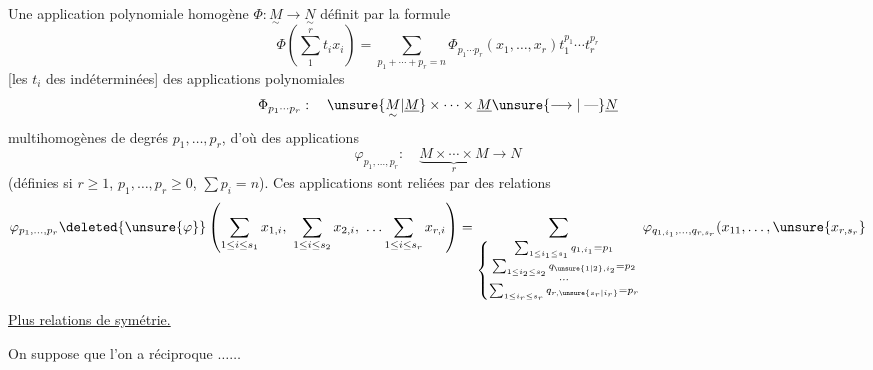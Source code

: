 Une application polynomiale homogène  $\Phi:\underset{\sim}{M}\longrightarrow\underset{\sim}{N}$ définit par la formule
\[
\Phi\left(\sum_1^r t_ix_i\right)=\sum_{p_1+\cdots+p_r=n}\Phi_{p_1\cdots p_r}(x_1,\ldots,x_r)t_1^{p_1}\cdots t_r^{p_r}
\]
[les $t_i$ des indéterminées] des applications polynomiales
\[
\Phi_{p_1\cdots p_r}:\quad\unsure{\underset{\sim}{M}|\underline M}\times\cdots\times\underline M\unsure{\longrightarrow|\mathrel{\text{---}}}\underline N
\]
multihomogènes de degrés $p_1,\ldots,p_r$, d'où des applications
\[
\varphi_{p_1,\ldots,p_r}:\quad\underbrace{M\times\cdots\times M}_{r}\longrightarrow N
\]
(définies si $r\geq1$, $p_1,\ldots,p_r\geq0$, $\sum p_i=n$). Ces applications sont reliées par des relations
\[
\varphi_{p_1,\ldots,p_r}\deleted{\unsure{\varphi}}\left(\sum_{1\leq i\leq s_1}x_{1,i},\ \sum_{1\leq i\leq s_2}x_{2,i},\ \ldots\sum_{1\leq i\leq s_r}x_{r,i}\right)
=\sum_{\left\{\substack{\sum_{1\leq i_1\leq s_1}q_{1,i_1}=p_1\\\sum_{1\leq i_2\leq s_2}q_{\unsure{1|2},i_2}=p_2\\\cdots\\\sum_{1\leq i_r\leq s_r}q_{r,\unsure{s_r|i_r}}=p_r}\right.}
\varphi_{q_{1,i_1},\ldots,q_{r,s_r}}(x_{11},\ldots,\unsure{x_{r,s_r}}
\]
\uline{Plus relations de symétrie.}

On suppose que l'on a  réciproque $\ldots\ldots$

